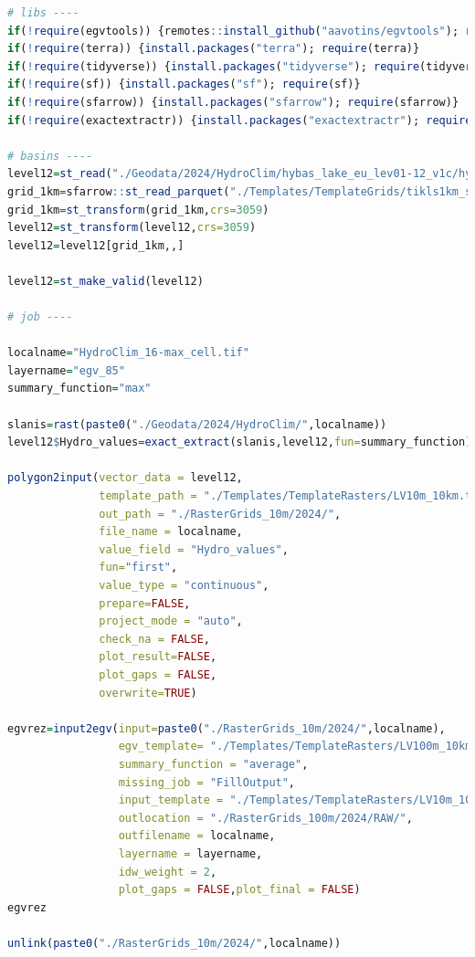 \documentclass[
]{book}
\begin{document}
\begin{lstlisting}[language=R]
# libs ----
if(!require(egvtools)) {remotes::install_github("aavotins/egvtools"); require(egvtools)}
if(!require(terra)) {install.packages("terra"); require(terra)}
if(!require(tidyverse)) {install.packages("tidyverse"); require(tidyverse)}
if(!require(sf)) {install.packages("sf"); require(sf)}
if(!require(sfarrow)) {install.packages("sfarrow"); require(sfarrow)}
if(!require(exactextractr)) {install.packages("exactextractr"); require(exactextractr)}

# basins ----
level12=st_read("./Geodata/2024/HydroClim/hybas_lake_eu_lev01-12_v1c/hybas_lake_eu_lev12_v1c.shp")
grid_1km=sfarrow::st_read_parquet("./Templates/TemplateGrids/tikls1km_sauzeme.parquet")
grid_1km=st_transform(grid_1km,crs=3059)
level12=st_transform(level12,crs=3059)
level12=level12[grid_1km,,]

level12=st_make_valid(level12)

# job ----

localname="HydroClim_16-max_cell.tif"
layername="egv_85"
summary_function="max"
  
slanis=rast(paste0("./Geodata/2024/HydroClim/",localname))
level12$Hydro_values=exact_extract(slanis,level12,fun=summary_function)
  
polygon2input(vector_data = level12,
              template_path = "./Templates/TemplateRasters/LV10m_10km.tif",
              out_path = "./RasterGrids_10m/2024/",
              file_name = localname,
              value_field = "Hydro_values",
              fun="first",
              value_type = "continuous",
              prepare=FALSE,
              project_mode = "auto",
              check_na = FALSE,
              plot_result=FALSE,
              plot_gaps = FALSE,
              overwrite=TRUE)
  
egvrez=input2egv(input=paste0("./RasterGrids_10m/2024/",localname),
                 egv_template= "./Templates/TemplateRasters/LV100m_10km.tif",
                 summary_function = "average",
                 missing_job = "FillOutput",
                 input_template = "./Templates/TemplateRasters/LV10m_10km.tif",
                 outlocation = "./RasterGrids_100m/2024/RAW/",
                 outfilename = localname,
                 layername = layername,
                 idw_weight = 2,
                 plot_gaps = FALSE,plot_final = FALSE)
egvrez
  
unlink(paste0("./RasterGrids_10m/2024/",localname))
\end{lstlisting}
\end{document}
